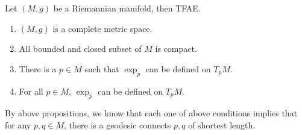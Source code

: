 \begin{thm}
	Let $(M,g)$ be a Riemannian manifold, then TFAE.
	\begin{enumerate}[label=(\arabic{*})]
		\item $(M,g)$ is a complete metric space.
		\item All bounded and closed subset of $M$ is compact.
		\item There is a $p \in M$ such that $\exp_p$ can be defined on $T_pM$.
		\item For all $p \in M$, $\exp_p$ can be defined on $T_pM$.
	\end{enumerate}
\end{thm}
\begin{rmk}
	By above propositions, we know that each one of above conditions implies that for any $p,q \in M$, there is a geodesic connects $p,q$ of shortest length.
\end{rmk}
